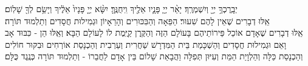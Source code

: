 \birkothatorah
יְבָֽרֶכְךָ֥ יְיָ֖ וְיִשְׁמְרֶֽךָ׃ יָאֵ֨ר יְיָ֧ פָּנָ֛יו אֵלֶ֖יךָ וִֽיחֻנֶּֽךָּ׃ יִשָּׂ֨א יְיָ֤ פָּנָיו֙ אֵלֶ֔יךָ וְיָשֵׂ֥ם לְךָ֖ שָׁלֽוֹם׃\\
אֵֽלּוּ דְבָרִים שֶׁאֵין לָהֶם שִׁעוּר׃ הַפֵּאָה וְהַבִּכּוּרִים וְהָרֵאָיוֹן וּגְמִילוּת חֲסָדִים וְתַלְמוּד תּוֹרָה׃\\
אֵֽלּוּ דְבָרִים שֶׁאָדָם אוֹכֵל פֵּירוֹתֵיהֶם בָּעוֹלָם הַזֶּה וְהַקֶּֽרֶן קַיֶּֽמֶת לוֹ לָעוֹלָם הַבָּא׃ וְאֵֽלּוּ הֵן - כִּבּוּד אָב וָאֵם וּגְמִילוּת חֲסָדִים וְהַשְׁכָּמַת בֵּית הַמִּדְרָשׁ שַׁחֲרִית וְעַרְבִית וְהַכְנָסַת אוֹרְחִים וּבִקּוּר חוֹלִים וְהַכְנָסַת כַּלָּה וְהַלְוָיַת הַמֵּת וְעִיּוּן תְּפִלָּה וַהֲבָאַת שָׁלוֹם בֵּין אָדָם לַחֲבֵרוֹ - וְתַלְמוּד תּוֹרָה כְּנֶֽגֶד כֻּלָּם׃

